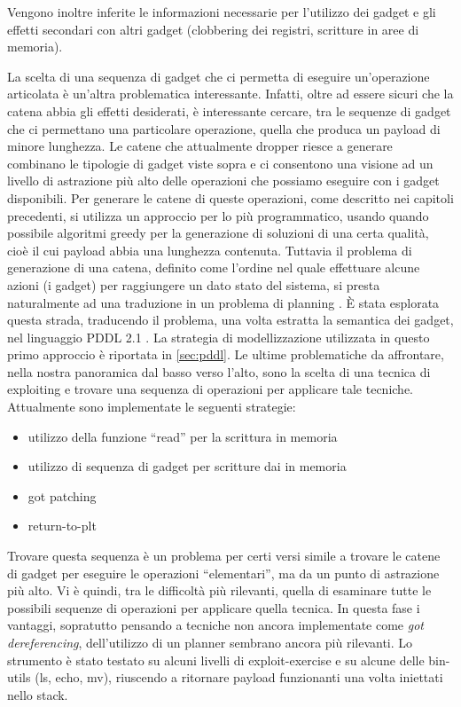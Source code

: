 Vengono inoltre inferite le informazioni necessarie per l'utilizzo dei
gadget e gli effetti secondari con altri gadget (clobbering dei
registri, scritture in aree di memoria).

La scelta di una sequenza di gadget che ci permetta di eseguire
un'operazione articolata è un'altra problematica
interessante. Infatti, oltre ad essere sicuri che la catena abbia gli
effetti desiderati, è interessante cercare, tra le sequenze di gadget
che ci permettano una particolare operazione, quella che produca un
payload di minore lunghezza. Le catene che attualmente dropper riesce
a generare combinano le tipologie di gadget viste sopra e ci
consentono una visione ad un livello di astrazione più alto delle
operazioni che possiamo eseguire con i gadget disponibili. Per
generare le catene di queste operazioni, come descritto nei capitoli
precedenti, si utilizza un approccio per lo più programmatico, usando
quando possibile algoritmi greedy per la generazione di soluzioni di
una certa qualità, cioè il cui payload abbia una lunghezza
contenuta. Tuttavia il problema di generazione di una catena, definito
come l'ordine nel quale effettuare alcune azioni (i gadget) per
raggiungere un dato stato del sistema, si presta naturalmente ad una
traduzione in un problema di planning . È stata esplorata questa
strada, traducendo il problema, una volta estratta la semantica dei
gadget, nel linguaggio PDDL 2.1 . La strategia
di modellizzazione utilizzata in questo primo approccio è riportata in
\ref{sec:pddl}. Le ultime problematiche da affrontare, nella nostra
panoramica dal basso verso l'alto, sono la scelta di una tecnica di
exploiting e trovare una sequenza di operazioni per applicare tale
tecniche.  Attualmente sono implementate le seguenti strategie:

\begin{itemize}
\item utilizzo della funzione ``read'' per la scrittura in memoria
\item utilizzo di sequenza di gadget per scritture dai in memoria
\item got patching
\item return-to-plt
\end{itemize}

Trovare questa sequenza è un problema per certi versi simile a trovare
le catene di gadget per eseguire le operazioni ``elementari'', ma da un
punto di astrazione più alto.  Vi è quindi, tra le difficoltà più
rilevanti, quella di esaminare tutte le possibili sequenze di
operazioni per applicare quella tecnica. In questa fase i vantaggi,
sopratutto pensando a tecniche non ancora implementate come \emph{got
  dereferencing}, dell'utilizzo di un planner sembrano ancora più
rilevanti. Lo strumento è stato testato su alcuni livelli di
exploit-exercise e su alcune delle bin-utils
(ls, echo, mv), riuscendo a ritornare payload funzionanti una volta
iniettati nello stack.

